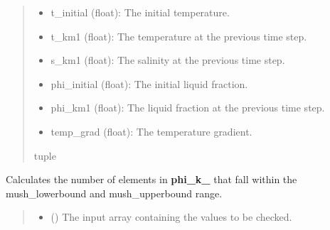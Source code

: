 \documentclass[a4paper,11pt,english,openany]{sphinxmanual}
\begin{document}
\begin{fulllineitems}
\begin{fulllineitems}
\begin{quote}
\begin{description}
\begin{itemize}
\end{itemize}

\sphinxAtStartPar
\begin{description}
\begin{itemize}
\item {} 
\sphinxAtStartPar
t\_initial (float): The initial temperature.

\item {} 
\sphinxAtStartPar
t\_km1 (float): The temperature at the previous time step.

\item {} 
\sphinxAtStartPar
s\_km1 (float): The salinity at the previous time step.

\item {} 
\sphinxAtStartPar
phi\_initial (float): The initial liquid fraction.

\item {} 
\sphinxAtStartPar
phi\_km1 (float): The liquid fraction at the previous time step.

\item {} 
\sphinxAtStartPar
temp\_grad (float): The temperature gradient.

\end{itemize}

\end{description}


\sphinxAtStartPar
tuple

\end{description}\end{quote}

\end{fulllineitems}


\begin{fulllineitems}
\label{\detokenize{api/spyice.models.sea_ice_model:src.spyice.models.sea_ice_model.SeaIceModel.phi_all_mush_list}}
\pysigstartsignatures
\pysiglinewithargsret
{}
{\sphinxparamcomma {}}
{}
\pysigstopsignatures
\sphinxAtStartPar
Calculates the number of elements in {\color{red}\bfseries{}phi\_k\_} that fall within the mush\_lowerbound and mush\_upperbound range.
\begin{quote}\begin{description}
\begin{itemize}
\item {} 
\sphinxAtStartPar
{} () \textendash{} The input array containing the values to be checked.


\end{itemize}
\end{description}
\end{quote}
\end{fulllineitems}
\end{fulllineitems}
\end{document}
